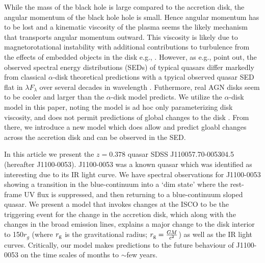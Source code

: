\documentclass{nature}
\begin{document}
While the mass of the black hole is large compared to the accretion disk, the angular momentum of the black hole hole is small. Hence angular momentum has to be lost and a kinematic viscosity of the plasma seems the likely mechanism that transports angular momentum outward.  This viscosity is likely due to magnetorotational instability \citep[MRI; ][]{Balbus_Hawley1991} with additional contributions to turbulence from the effects of embedded objects in the disk e.g., \cite{McKernan2014}.  However, as e.g., \cite{Koratkar_Blaes1999, Sirko_Goodman2003} point out, the observed spectral energy distributions (SEDs) of typical quasars differ markedly from classical $\alpha$-disk theoretical predictions \citep[][]{SS73, Pringle1981} with a tpyical observed quasar SED flat in $\lambda F_{\lambda}$ over several decades in wavelength \citep{Elvis1994, Richards2006b}. Futhermore, real AGN disks seem to be cooler \cite[e.g., ][]{Lawrence2012} and larger \cite[e.g.,][]{Pooley2007, Morgan2010, Morgan2012, Mosquera2011} than the $\alpha$-disk model predicts. We utilize the $\alpha$-disk model in this paper, noting the model is ad hoc only parameterizing disk viscosity, and does not permit predictions of global changes to the disk \cite{King2012}. From there, we introduce a new model which does allow and predict gloabl changes across the accretion disk and can be observed in the SED. 

In this article we present the $z=0.378$ quasar SDSS J110057.70-005304.5 (hereafter J1100-0053).  J1100-0053 was a known quasar which was identified as interesting due to its IR light curve. We have spectral observations for J1100-0053 showing a transition in the blue-continuum into a `dim state' where the rest-frame UV flux is suppressed, and then returning to a blue-continuum sloped quasar.  We present a model that invokes changes at the ISCO to be the triggering event for the change in the accretion disk, which along with the changes in the broad emission lines, explains a major change to the disk interior to 150$r_{g}$ (where $r_{\rm g}$ is the gravitational radius; $r_{\rm g}=\frac{GM}{c^2}$) as well as the IR light curves. Critically, our model makes predictions to the future behaviour of J1100-0053 on the time scales of months to $\sim$few years. 
\end{document}
